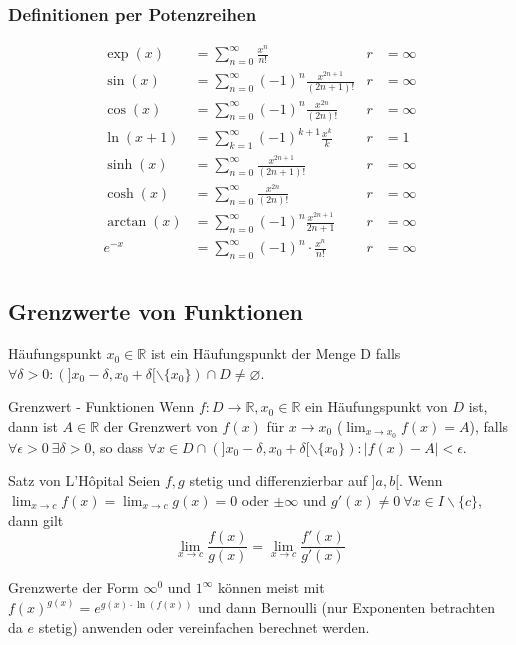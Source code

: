 \documentclass[a4paper,10pt]{article}
\def\sumk{\sum_{k=1}^\infty}
\def\sumn{\sum_{n=0}^\infty}
\def\R{\mathbb{R}}
\begin{document}
\subsubsection{Definitionen per Potenzreihen}
\begin{align*}
\exp(x) &= \sumn \frac{x^n}{n!} & r &= \infty \\
\sin(x) &= \sumn (-1)^n \frac{x^{2n + 1}}{(2n + 1)!} & r &= \infty \\
\cos(x) &= \sumn (-1)^n \frac{x^{2n}}{(2n)!} & r &= \infty \\
\ln(x + 1) &= \sumk (-1)^{k+1} \frac{x^k}{k} & r &= 1 \\
\sinh(x) &= \sumn \frac{x^{2n+1}}{(2n+1)!} & r &= \infty \\
\cosh(x) &= \sumn \frac{x^{2n}}{(2n)!} & r &= \infty \\
\arctan(x) &= \sumn (-1)^n \frac{x^{2n+1}}{2n+1} & r &= \infty \\
e^{-x} &= \sumn (-1)^n \cdot \frac{x^n}{n!} & r &= \infty \\
\end{align*}

\subsection{Grenzwerte von Funktionen}
\begin{subbox}{Häufungspunkt}
 $x_0 \in \R$ ist ein Häufungspunkt der Menge D falls $\forall \delta > 0: (]x_0 - \delta, x_0 + \delta[ \backslash \{x_0\}) \cap D \ne \varnothing$.
\end{subbox}

\begin{mainbox}{Grenzwert - Funktionen}
 Wenn $f: D \to \R, x_0 \in \R$ ein Häufungspunkt von $D$ ist, dann ist $A \in \R$ der Grenzwert von $f(x)$ für $x \to x_0$ ($\lim_{x\to x_0} f(x) = A$), falls $\forall \epsilon > 0 \ \exists \delta > 0$, so dass $\forall x \in D \cap (]x_0 - \delta, x_0 + \delta[ \backslash \{x_0\}): |f(x) - A| < \epsilon$.
\end{mainbox}

\begin{subbox}{Satz von L'Hôpital}
  Seien $f,g$ stetig und differenzierbar auf $]a,b[$. Wenn $\lim_{x\to c} f(x) = \lim_{x \to c} g(x) = 0$ oder $\pm \infty$ und $g'(x) \ne 0 \ \forall x \in I \backslash \{c\}$, dann gilt $$\lim_{x\to c} \frac{f(x)}{g(x)} = \lim_{x\to c}\frac{f'(x)}{g'(x)}$$
\end{subbox}

Grenzwerte der Form $\infty^0$ und $1^\infty$ können meist mit $f(x)^{g(x)} = e^{g(x)\cdot \ln(f(x))}$ und dann Bernoulli (nur Exponenten betrachten da $e$ stetig) anwenden oder vereinfachen berechnet werden.
\end{document}
